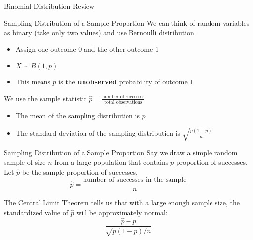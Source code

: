\documentclass{beamer}
\begin{document}
\begin{frame}{Binomial Distribution Review}

	

\end{frame}

\begin{frame}{Sampling Distribution of a Sample Proportion}
	We can think of random variables as binary (take only two values) and use Bernoulli distribution
	\begin{itemize}
		\item Assign one outcome 0 and the other outcome 1
		
		\item $X \sim B(1,p)$
		
		\item This means $p$ is the \textbf{unobserved} probability of outcome 1
	\end{itemize}
	
	We use the sample statistic $\hat{p}=\frac{\text{number of successes}}{\text{total observations}}$

	\begin{itemize}
		\item \footnotesize{The \alert{mean} of the sampling distribution is $p$}
		\item \footnotesize{The \alert{standard deviation} of the sampling distribution is} $\sqrt{\frac{p(1-p)}{n}}$
	\end{itemize}
	
\end{frame}

\begin{frame}{Sampling Distribution of a Sample Proportion}
	Say we draw a simple random sample of size $n$ from a large population that contains $p$ proportion of successes.  Let $\hat{p}$ be the \alert{sample proportion} of successes,
	\[
		\hat{p}=\frac{\text{number of successes in the sample}}{n}
	\]
	
	The \alert{Central Limit Theorem} tells us that with a large enough sample size, the standardized value of $\hat{p}$ will be approximately normal:
	\[
		\frac{\hat{p}-p}{\sqrt{p(1-p)/n}}
	\]

\end{frame}
\end{document}
